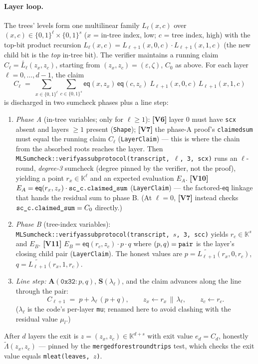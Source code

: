 \documentclass[11pt]{article}
\newcommand{\K}{\mathbb{K}}            %
\newcommand{\bits}{\{0,1\}}
\newcommand{\mle}[1]{\widetilde{#1}}
\newcommand{\eq}{\mathsf{eq}}
\newcommand{\code}[1]{{\def\_{\textunderscore\allowbreak}\texttt{#1}}}
\newcommand{\Vc}[1]{\textbf{[V#1]}}    %
\begin{document}
\paragraph{Layer loop.}  The trees' levels form one multilinear family
$L_\ell(x, c)$ over $(x, c) \in \bits^\ell \times \bits^s$ ($x$ = in-tree
index, low; $c$ = tree index, high) with the top-bit product recursion
$L_\ell(x,c) = L_{\ell+1}(x, 0, c) \cdot L_{\ell+1}(x, 1, c)$ (the new
child bit is the \emph{top} in-tree bit).  The verifier maintains a
running claim $C_\ell = \mle{L_\ell}(z_x, z_c)$, starting from
$(z_x, z_c) = (\varepsilon, \zeta)$, $C_0$ as above.  For each layer
$\ell = 0, \dots, d-1$, the claim
\[
  C_\ell \;=\; \sum_{x \in \bits^\ell} \sum_{c \in \bits^s}
  \eq(x, z_x)\, \eq(c, z_c)\; L_{\ell+1}(x,0,c)\, L_{\ell+1}(x,1,c)
\]
is discharged in two sumcheck phases plus a line step:
\begin{enumerate}[leftmargin=2.2em, itemsep=1pt]
\item \emph{Phase A} (in-tree variables; only for $\ell \ge 1$):
  \Vc{6} layer $0$ must have \code{sc\_x} absent and layers $\ge 1$
  present (\code{Shape});
  \Vc{7} the phase-A proof's \code{claimed\_sum} must equal the running
  claim $C_\ell$ (\code{LayerClaim}) — this is where the chain from the
  absorbed roots reaches the layer.  Then
  \code{MLSumcheck::verify\_as\_subprotocol(transcript, $\ell$, 3, sc\_x)}
  runs an $\ell$-round, \emph{degree-3} sumcheck (degree pinned by the
  verifier, not the proof), yielding a point $r_x \in \K^\ell$ and an
  expected evaluation $E_A$.
  \Vc{10} $E_A = \eq(r_x, z_x)\cdot \code{sc\_c.claimed\_sum}$
  (\code{LayerClaim}) — the factored-$\eq$ linkage that hands the residual
  sum to phase B.  (At $\ell = 0$, \Vc{7} instead checks
  $\code{sc\_c.claimed\_sum} = C_0$ directly.)
\item \emph{Phase B} (tree-index variables):
  \code{MLSumcheck::verify\_as\_subprotocol(transcript, $s$, 3, sc\_c)}
  yields $r_c \in \K^s$ and $E_B$.
  \Vc{11} $E_B = \eq(r_c, z_c)\cdot p \cdot q$ where
  $(p, q) = \code{pair}$ is the layer's closing child pair
  (\code{LayerClaim}).  The honest values are
  $p = \mle{L_{\ell+1}}(r_x, 0, r_c)$, $q = \mle{L_{\ell+1}}(r_x, 1, r_c)$.
\item \emph{Line step:}
  $\mathbf{A}(\mathtt{0x32}\!:\!p, q)$, $\mathbf{S}(\lambda_\ell)$, and the
  claim advances along the line through the pair:
  \[
    C_{\ell+1} \;=\; p + \lambda_\ell\,(p + q), \qquad
    z_x \leftarrow r_x \,\|\, \lambda_\ell, \qquad
    z_c \leftarrow r_c .
  \]
  ($\lambda_\ell$ is the code's per-layer \code{mu}; renamed here to avoid
  clashing with the residual value $\mu_l$.)
\end{enumerate}
After $d$ layers the exit is $z = (z_x, z_c) \in \K^{d+s}$ with exit value
$e_d = C_d$, honestly $\mle{\Lambda}(z_x, z_c)$ — pinned by the
\code{merged\_forest\_roundtrips} test, which checks the exit value equals
\code{mle\_at(leaves, $z$)}.
\end{document}
